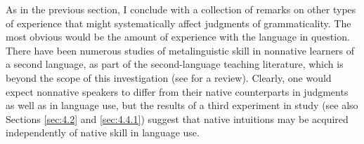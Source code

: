 As in the previous section, I conclude with a collection of remarks on other types of experience that might systematically affect judgments of grammaticality. The most obvious would be the amount of experience with the language in question. There have been numerous studies of metalinguistic skill in nonnative learners of a second language, as part of the second-language teaching literature, which is beyond the scope of this investigation (see \citet{Ellis1991} for a review). Clearly, one would expect nonnative speakers to differ from their native counterparts in judgments as well as in language use, but the results of a third experiment
in  study (see also Sections \ref{sec:4.2} and \ref{sec:4.4.1})
suggest that native intuitions may be acquired independently of native skill in language use.

